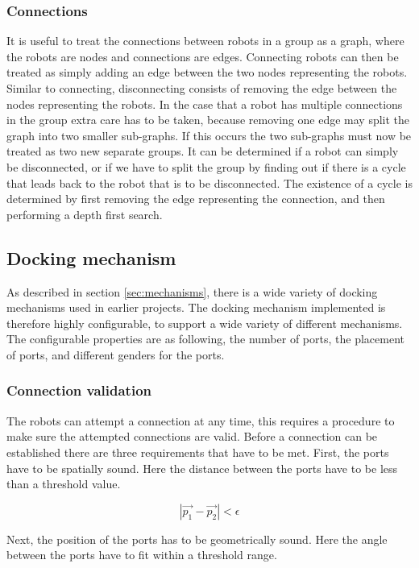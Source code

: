 \subsubsection{Connections}
It is useful to treat the connections between robots in a group as a graph, where the robots are nodes and connections are edges.
Connecting robots can then be treated as simply adding an edge between the two nodes representing the robots.
Similar to connecting, disconnecting consists of removing the edge between the nodes representing the robots.
In the case that a robot has multiple connections in the group extra care has to be taken, because removing one edge may split the graph into two smaller sub-graphs.
If this occurs the two sub-graphs must now be treated as two new separate groups.
It can be determined if a robot can simply be disconnected, or if we have to split the group by finding out if there is a cycle that leads back to the robot that is to be disconnected.
The existence of a cycle is determined by first removing the edge representing the connection, and then performing a depth first search.
	
	 
\subsection{Docking mechanism}
As described in section \ref{sec:mechanisms}, there is a wide variety of docking mechanisms used in earlier projects.
The docking mechanism implemented is therefore highly configurable, to support a wide variety of different mechanisms.
The configurable properties are as following, the number of ports, the placement of ports, and different genders for the ports. 
	
\subsubsection{Connection validation}
The robots can attempt a connection at any time, this requires a procedure to make sure the attempted connections are valid.
Before a connection can be established there are three requirements that have to be met.
First, the ports have to be spatially sound. 
Here the distance between the ports have to be less than a threshold value.
		
\begin{equation}
	|\vec{p_1} - \vec{p_2}| < \epsilon
\end{equation}
		
Next, the position of the ports has to be geometrically sound.
Here the angle between the ports have to fit within a threshold range.
		
